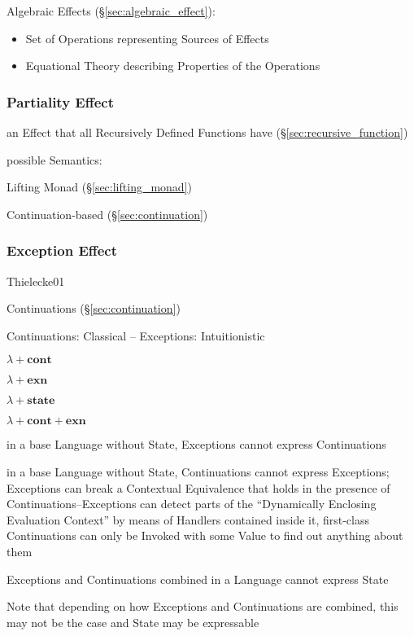 Algebraic Effects (\S\ref{sec:algebraic_effect}):
\begin{itemize}
  \item Set of Operations representing Sources of Effects
  \item Equational Theory describing Properties of the Operations
\end{itemize}



\subsubsection{Partiality Effect}\label{sec:partiality_effect}

an Effect that all Recursively Defined Functions have
(\S\ref{sec:recursive_function})

possible Semantics:

Lifting Monad (\S\ref{sec:lifting_monad})

Continuation-based (\S\ref{sec:continuation})



\subsubsection{Exception Effect}\label{sec:exception_effect}

Thielecke01

Continuations (\S\ref{sec:continuation})

Continuations: Classical -- Exceptions: Intuitionistic

$\lambda + \mathbf{cont}$

$\lambda + \mathbf{exn}$

$\lambda + \mathbf{state}$

$\lambda + \mathbf{cont} + \mathbf{exn}$

in a base Language without State, Exceptions cannot express
Continuations

in a base Language without State, Continuations cannot express
Exceptions; Exceptions can break a Contextual Equivalence that holds
in the presence of Continuations--Exceptions can detect parts of the
``Dynamically Enclosing Evaluation Context'' by means of Handlers
contained inside it, first-class Continuations can only be Invoked
with some Value to find out anything about them

Exceptions and Continuations combined in a Language cannot express
State

\fist Note that depending on how Exceptions and Continuations are
combined, this may not be the case and State may be expressable

